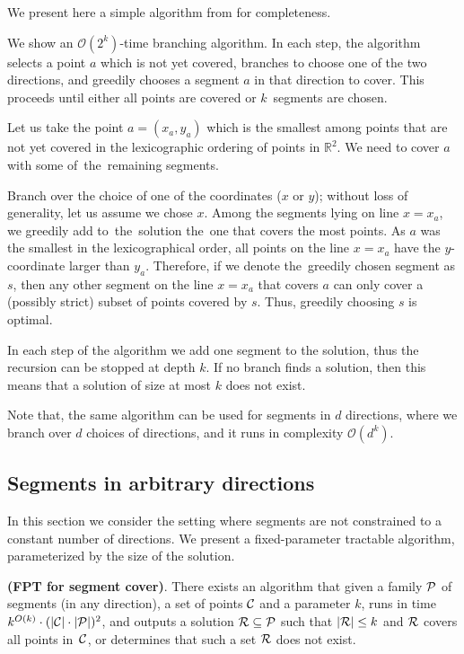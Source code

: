 We present here a simple algorithm from \cite{platypus_book} for completeness.

We show an $\mathcal{O}(2^k)$-time branching algorithm.
In each step, the algorithm selects a point $a$ which is not yet covered,
branches to choose one of the two directions, and greedily chooses
a segment $a$ in that direction to cover.
This proceeds until either all points are covered or $k$~segments are chosen.

Let us take
the point $a=(x_a,y_a)$ which is the smallest 
among points that are not yet covered
in the lexicographic ordering
of points in $\mathbb{R}^2$.
We need to cover $a$ with some of~the~remaining segments.

Branch over the choice of one of the coordinates ($x$ or $y$);
without loss of generality, let us assume we chose $x$.
Among the segments lying on line $x = x_a$,
we greedily add to~the~solution the~one that covers the most points.
As $a$ was the smallest in the lexicographical order,
all points on the line $x = x_a$ have the $y$-coordinate larger than $y_a$.
Therefore, if we denote the~greedily chosen segment as $s$,
then any other segment on the line $x = x_a$ that covers $a$ can only
cover a (possibly strict) subset of points covered by $s$.
Thus, greedily choosing $s$ is optimal.

In each step of the algorithm we add one segment to the solution,
thus the recursion can be stopped at depth $k$.
If no branch finds a solution, then this means
that a solution of size at most $k$ does not exist.

Note that, the same algorithm can be used for segments in $d$ directions,
where we branch over $d$ choices of directions, and it runs in complexity $\mathcal{O}(d^k)$.

\subsection{Segments in arbitrary directions}
\label{segments_in_arbitrary_direction}
In this section we consider the setting where segments are not constrained
to a constant number of directions. 
We present a fixed-parameter tractable algorithm,
parameterized by the size of the solution.

\begin{tw}{
	\label{segment_cover_fpt}
	\textbf{(FPT for segment cover)}.
	There exists an algorithm that given a family $\mathcal{P}$ of
	segments (in any direction),
	a set of points $\mathcal{C}$
	and a parameter $k$,
	runs in time $k^{O(k)} \cdot (|\mathcal{C}|\cdot|\mathcal{P}|)^2$,
	and outputs a solution $\mathcal{R} \subseteq \mathcal{P}$
	such that $|\mathcal{R}| \le k$ and $\mathcal{R}$ covers all points in~$\mathcal{C}$,
	or determines that such a set $\mathcal{R}$ does not exist.
}\end{tw}

